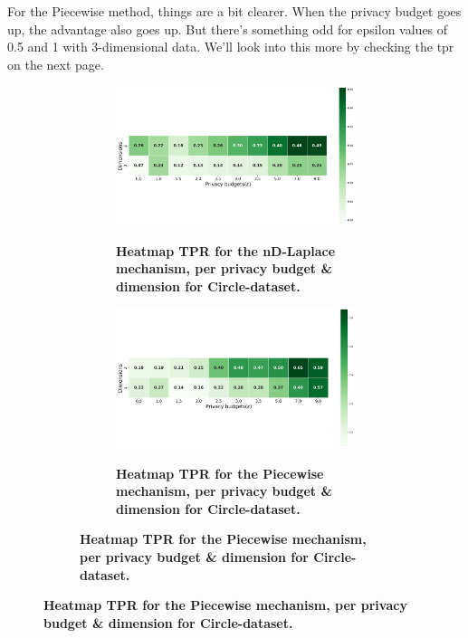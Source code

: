 For the Piecewise method, things are a bit clearer. When the privacy budget goes up, the advantage also goes up. But there's something odd for epsilon values of 0.5 and 1 with 3-dimensional data. We'll look into this more by checking the \gls{tpr} on the next page.

\newpage
\begin{figure}[H]
  \centering
  \begin{subfigure}[b]{0.9\textwidth}
    \begin{subfigure}[c]{1\textwidth}
      \caption{\textbf{Heatmap TPR for the nD-Laplace mechanism, per privacy budget \& dimension for Circle-dataset.}}
      \includegraphics[width=1\textwidth]{Results/nd-laplace/nd-Laplace/circle-dataset/tpr.png}
      \label{fig:privacy_tpr_circle-dataset_adversial_advantage_kd-laplace}
    \end{subfigure}
    \vfill %

    \begin{subfigure}[c]{1\textwidth}
      \caption{\textbf{Heatmap TPR for the Piecewise mechanism, per privacy budget \& dimension for Circle-dataset.}}
      \includegraphics[width=1\textwidth]{Results/nd-laplace/piecewise/circle-dataset/tpr.png}
      \label{fig:privacy_tpr_circle-dataset_adversial_advantage_piecewise}
    \end{subfigure}
  \end{subfigure}
\end{figure}
